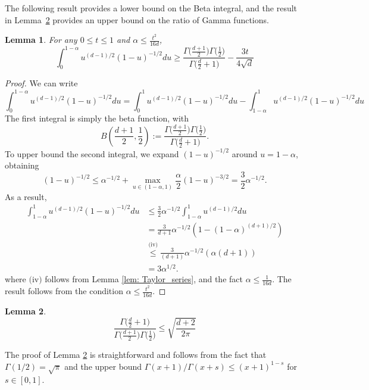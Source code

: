 \documentclass[11pt,twoside]{article}
\newtheorem{lemma}{Lemma}
\theoremstyle{definition}
\newcommand{\1}{\mathbbm{1}}
\begin{document}
The following result provides a lower bound on the Beta integral, and the result in Lemma~\ref{lem: beta_function} provides
an upper bound on the ratio of Gamma functions. 
\begin{lemma}
	\label{lem: beta_integral}
	For any $0 \leq t \leq 1$ and $\alpha \leq \frac{t^2}{16 d}$,
	\begin{equation*}
	\int_{0}^{1 - \alpha}u^{(d-1)/2}(1 - u)^{-1/2}du \geq \frac{\Gamma\bigl(\frac{d + 1}{2}\bigr)\Gamma\bigl(\frac{1}{2}\bigr)}{ \Gamma\bigl(\frac{d}{2}+ 1\bigr)} - \frac{3t}{4\sqrt{d}}
	\end{equation*}
\end{lemma}
\begin{proof}
	We can write 
	\begin{equation*}
	\int_{0}^{1 - \alpha}u^{(d-1)/2}(1 - u)^{-1/2}du = \int_{0}^{1}u^{(d-1)/2}(1 - u)^{-1/2}du - \int_{1 - \alpha}^{1}u^{(d-1)/2}(1 - u)^{-1/2}du
	\end{equation*}
	The first integral is simply the beta function, with
	\begin{equation*}
	B(\frac{d+1}{2},\frac{1}{2}) := \frac{\Gamma\bigl(\frac{d + 1}{2}\bigr)\Gamma\bigl(\frac{1}{2}\bigr)}{ \Gamma\bigl(\frac{d}{2}+ 1\bigr)}.
	\end{equation*}
	To upper bound the second integral, we expand $(1 - u)^{-1/2}$ around $u = 1 - \alpha$, obtaining
	\begin{equation*}
	(1 - u)^{-1/2} \leq \alpha^{-1/2} + \max_{u \in (1 - \alpha, 1)} \frac{\alpha}{2} (1 - u)^{-3/2} = \frac{3}{2}\alpha^{-1/2}.
	\end{equation*}
	As a result,
	\begin{align*}
	\int_{1 - \alpha}^{1}u^{(d-1)/2}(1 - u)^{-1/2}du & \leq \frac{3}{2}\alpha^{-1/2} \int_{1 - \alpha}^{1}u^{(d-1)/2}du \\
	& = \frac{3}{d+1}\alpha^{-1/2} \left(1 - (1 - \alpha)^{(d + 1)/2}\right) \\
	& \overset{\text{(iv)}}{\leq} \frac{3}{(d+1)}\alpha^{-1/2} (\alpha(d + 1)) \\
	& =  3\alpha^{1/2}.
	\end{align*}
	where $\text{(iv)}$ follows from Lemma \ref{lem: Taylor_series}, and the fact $\alpha \leq \frac{1}{16d}$. The result follows from the condition $\alpha \leq \frac{t^2}{16d}$. 
\end{proof}

\begin{lemma}
	\label{lem: beta_function}
	\begin{equation*}
	\frac{\Gamma\bigl(\frac{d}{2}+ 1\bigr)}{\Gamma\bigl(\frac{d + 1}{2}\bigr) \Gamma\bigl(\frac{1}{2}\bigr)} \leq \sqrt{\frac{d + 2}{2\pi}}
	\end{equation*}
\end{lemma}
\noindent The proof of Lemma \ref{lem: beta_function} is straightforward and follows from the fact that $\Gamma(1/2) = \sqrt{\pi}$ and the upper bound $\Gamma(x + 1)/ \Gamma(x+s) \leq (x + 1)^{1-s}$ for $s \in [0,1]$.
\end{document}
